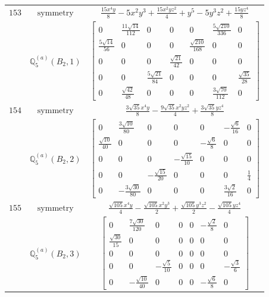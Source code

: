 \documentclass[fleqn,8pt,landscape]{jsarticle}
\begin{document}
\begin{longtable}{ccc}
$ 153 $ & $ \text{symmetry} $ & $ \frac{15 x^{4} y}{8} - 5 x^{2} y^{3} + \frac{15 x^{2} y z^{2}}{4} + y^{5} - 5 y^{3} z^{2} + \frac{15 y z^{4}}{8} $ \\
$  $ & $ \mathbb{Q}_{5}^{(a)}(B_{2},1) $ & $ \begin{bmatrix} 0 & \frac{11 \sqrt{14}}{112} & 0 & 0 & 0 & \frac{5 \sqrt{210}}{336} & 0 \\ \frac{5 \sqrt{14}}{56} & 0 & 0 & 0 & \frac{\sqrt{210}}{168} & 0 & 0 \\ 0 & 0 & 0 & \frac{\sqrt{21}}{42} & 0 & 0 & 0 \\ 0 & 0 & \frac{5 \sqrt{21}}{84} & 0 & 0 & 0 & \frac{\sqrt{35}}{28} \\ 0 & \frac{\sqrt{42}}{48} & 0 & 0 & 0 & \frac{3 \sqrt{70}}{112} & 0 \end{bmatrix} $ \\ \hline
$ 154 $ & $ \text{symmetry} $ & $ \frac{3 \sqrt{35} x^{4} y}{8} - \frac{9 \sqrt{35} x^{2} y z^{2}}{4} + \frac{3 \sqrt{35} y z^{4}}{8} $ \\
$  $ & $ \mathbb{Q}_{5}^{(a)}(B_{2},2) $ & $ \begin{bmatrix} 0 & \frac{3 \sqrt{10}}{80} & 0 & 0 & 0 & - \frac{\sqrt{6}}{16} & 0 \\ \frac{\sqrt{10}}{40} & 0 & 0 & 0 & - \frac{\sqrt{6}}{8} & 0 & 0 \\ 0 & 0 & 0 & - \frac{\sqrt{15}}{10} & 0 & 0 & 0 \\ 0 & 0 & - \frac{\sqrt{15}}{20} & 0 & 0 & 0 & \frac{1}{4} \\ 0 & - \frac{3 \sqrt{30}}{80} & 0 & 0 & 0 & \frac{3 \sqrt{2}}{16} & 0 \end{bmatrix} $ \\ \hline
$ 155 $ & $ \text{symmetry} $ & $ \frac{\sqrt{105} x^{4} y}{4} - \frac{\sqrt{105} x^{2} y^{3}}{2} + \frac{\sqrt{105} y^{3} z^{2}}{2} - \frac{\sqrt{105} y z^{4}}{4} $ \\
$  $ & $ \mathbb{Q}_{5}^{(a)}(B_{2},3) $ & $ \begin{bmatrix} 0 & \frac{7 \sqrt{30}}{120} & 0 & 0 & 0 & - \frac{\sqrt{2}}{8} & 0 \\ \frac{\sqrt{30}}{15} & 0 & 0 & 0 & 0 & 0 & 0 \\ 0 & 0 & 0 & 0 & 0 & 0 & 0 \\ 0 & 0 & - \frac{\sqrt{5}}{10} & 0 & 0 & 0 & - \frac{\sqrt{3}}{6} \\ 0 & - \frac{\sqrt{10}}{40} & 0 & 0 & 0 & - \frac{\sqrt{6}}{8} & 0 \end{bmatrix} $ \\ \hline

\end{longtable}
\end{document}

